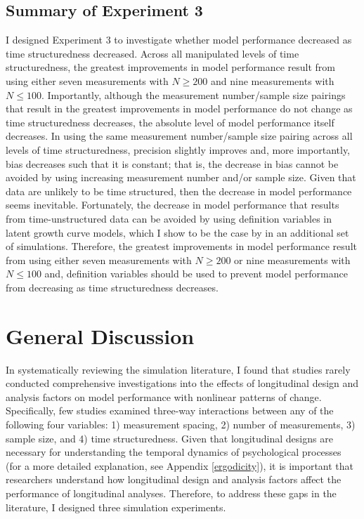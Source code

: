 \documentclass[
12pt, %
twoside,
english]{guelphthesis}
\begin{document}
\hypertarget{summary-of-experiment-3}{%
\section{Summary of Experiment 3}\label{summary-of-experiment-3}}

I designed Experiment 3 to investigate whether model performance decreased as time structuredness decreased. Across all manipulated levels of time structuredness, the greatest improvements in model performance result from using either seven measurements with \(N \ge 200\) and nine measurements with \(N \le 100\). Importantly, although the measurement number/sample size pairings that result in the greatest improvements in model performance do not change as time structuredness decreases, the absolute level of model performance itself decreases. In using the same measurement number/sample size pairing across all levels of time structuredness, precision slightly improves and, more importantly, bias decreases such that it is constant; that is, the decrease in bias cannot be avoided by using increasing measurement number and/or sample size. Given that data are unlikely to be time structured, then the decrease in model performance seems inevitable. Fortunately, the decrease in model performance that results from time-unstructured data can be avoided by using definition variables in latent growth curve models, which I show to be the case by in an additional set of simulations. Therefore, the greatest improvements in model performance result from using either seven measurements with \(N \ge 200\) or nine measurements with \(N \le 100\) and, definition variables should be used to prevent model performance from decreasing as time structuredness decreases.

\hypertarget{general-discussion}{%
\chapter{General Discussion}\label{general-discussion}}

In systematically reviewing the simulation literature, I found that studies rarely conducted comprehensive investigations into the effects of longitudinal design and analysis factors on model performance with nonlinear patterns of change. Specifically, few studies examined three-way interactions between any of the following four variables: 1) measurement spacing, 2) number of measurements, 3) sample size, and 4) time structuredness. Given that longitudinal designs are necessary for understanding the temporal dynamics of psychological processes (for a more detailed explanation, see Appendix \ref{ergodicity}), it is important that researchers understand how longitudinal design and analysis factors affect the performance of longitudinal analyses. Therefore, to address these gaps in the literature, I designed three simulation experiments.
\end{document}
